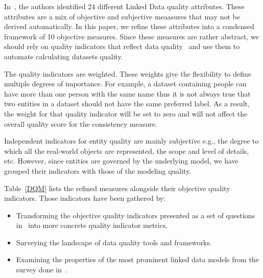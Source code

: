 In~\cite{Assaf:DQMST:12}, the authors identified 24 different Linked Data quality attributes. These attributes are a mix of objective and subjective meaasures that may not be derived automatically. In this paper, we refine these attributes into a condensed framework of 10 objective measures. Since these measures are rather abstract, we should rely on quality indicators that reflect data quality~\cite{Flemming:Thesis:10} and use them to automate calculating datasets quality.

The quality indicators are weighted. These weights give the flexibility to define multiple degrees of importance. For example, a dataset containing people can have more than one person with the same name thus it is not always true that two entities in a dataset should not have the same preferred label. As a result, the weight for that quality indicator will be set to zero and will not affect the overall quality score for the consistency measure.

Independent indicators for entity quality are mainly subjective e.g., the degree to which all the real-world objects are represented, the scope and level of details, etc. However, since entities are governed by the underlying model, we have grouped their indicators with those of the modeling quality.

Table~\ref{DQM} lists the refined measures alongside their objective quality indicators. Those indicators have been gathered by:

\begin{itemize}
	\item Transforming the objective quality indicators presented as a set of questions in~\cite{Assaf:DQMST:12} into more concrete quality indicator metrics.
	\item Surveying the landscape of data quality tools and frameworks.
	\item Examining the properties of the most prominent linked data models from the survey done in~\cite{Assaf:PROFILES:15}.
\end{itemize}

